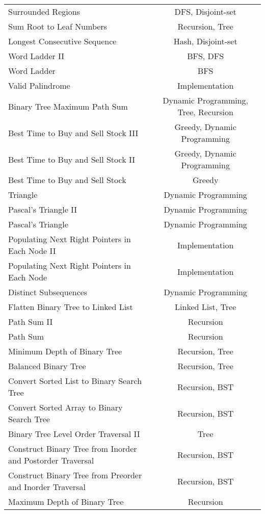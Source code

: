 \documentclass[paper=a4, fontsize=11pt]{scrartcl} %
\begin{document}
\begin{center}
\begin{longtable}{|l|c|}
    Surrounded Regions  &   DFS, Disjoint-set    \\
    Sum Root to Leaf Numbers    &   Recursion, Tree   \\
    Longest Consecutive Sequence    &   Hash, Disjoint-set    \\
    Word Ladder II  &   BFS, DFS    \\
    Word Ladder &   BFS \\
    Valid Palindrome    &   Implementation  \\
    Binary Tree Maximum Path Sum    &   Dynamic Programming, Tree, Recursion \\
    Best Time to Buy and Sell Stock III &   Greedy, Dynamic Programming \\
    Best Time to Buy and Sell Stock II  &   Greedy, Dynamic Programming \\
    Best Time to Buy and Sell Stock &   Greedy  \\
    Triangle    &   Dynamic Programming    \\
    Pascal's Triangle II    &   Dynamic Programming \\
    Pascal's Triangle   &   Dynamic Programming \\
    Populating Next Right Pointers in Each Node II  &   Implementation  \\
    Populating Next Right Pointers in Each Node &   Implementation  \\
    Distinct Subsequences   &   Dynamic Programming \\
    Flatten Binary Tree to Linked List  &   Linked List, Tree\\
    Path Sum II &   Recursion   \\
    Path Sum    &   Recursion   \\
    Minimum Depth of Binary Tree    &   Recursion, Tree   \\
    Balanced Binary Tree    &   Recursion, Tree   \\
    Convert Sorted List to Binary Search Tree   &   Recursion, BST \\
    Convert Sorted Array to Binary Search Tree  &   Recursion, BST  \\
    Binary Tree Level Order Traversal II    &   Tree  \\
    Construct Binary Tree from Inorder and Postorder Traversal  &   Recursion, BST  \\
    Construct Binary Tree from Preorder and Inorder Traversal   &   Recursion, BST  \\
    Maximum Depth of Binary Tree    &   Recursion   \\

\end{longtable}
\end{center}
\end{document}
